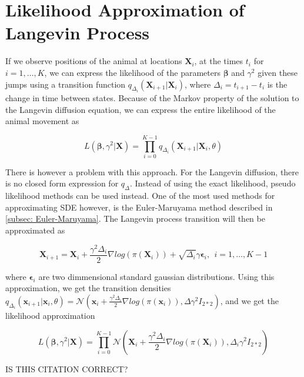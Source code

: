\section{Likelihood Approximation of Langevin Process}
\label{sec: Likelihood Approximation of Langevin Process}
If we observe positions of the animal at locations $\textbf{X}_i$, at the times $t_i$ for $i=1,\dots , K$, we can express the likelihood of the parameters $\bm{\beta}$ and $\gamma^2$ given these jumps using a transition function $q_{\Delta_i}(\textbf{X}_{i+1} | \textbf{X}_i)$, where $\Delta_i = t_{i+1} - t_i$ is the change in time between states. Because of the Markov property of the solution to the Langevin diffusion equation, we can express the entire likelihood of the animal movement as

\begin{equation}
    L(\bm{\beta}, \gamma^2 | \textbf{X}) = \prod_{i=0}^{K-1} q_{\Delta_i}(\textbf{X}_{i+1} | \textbf{X}_i, \theta)
    \label{eq: Langevin likelihood}
\end{equation}

There is however a problem with this approach. For the Langevin diffusion, there is no closed form expression for $q_\Delta$\parencite{gloaguen_stochastic_2018}. Instead of using the exact likelihood, pseudo likelihood methods can be used instead. One of the most used methods for approximating SDE however, is the Euler-Maruyama method described in \ref{subsec: Euler-Maruyama}. The Langevin process transition will then be approximated as

$$
    \textbf{X}_{i+1} = \textbf{X}_i + \frac{\gamma^2 \Delta_i}{2}\nabla log(\pi(\textbf{X}_i)) + \sqrt{\Delta_i}\gamma \bm{\epsilon}_i, \ \ i = 1,\dots , K-1
$$

where $\bm{\epsilon}_i$ are two dimmensional standard gaussian distributions. Using this approximation, we get the transition densities $q_{\Delta_i}(\textbf{x}_{i+1} | \textbf{x}_i, \theta) = \mathcal{N}(\textbf{x}_i + \frac{\gamma^2 \Delta_i}{2}\nabla log(\pi(\textbf{x}_i)), \Delta \gamma^2 I_{2*2})$, and we get the likelihood approximation

$$L(\bm{\beta}, \gamma^2 | \textbf{X}) = \prod_{i=0}^{K-1} \mathcal{N}(\textbf{X}_i + \frac{\gamma^2 \Delta_i}{2}\nabla log(\pi(\textbf{X}_i)), \Delta_i \gamma^2 I_{2*2})$$


IS THIS CITATION CORRECT?







